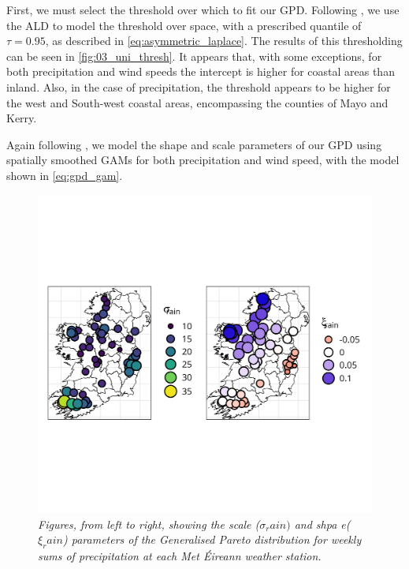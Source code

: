 \documentclass{article}
\numberwithin{equation}{section}
\begin{document}
First, we must select the threshold over which to fit our GPD. 
Following \citet{Youngman2019}, we use the ALD to model the threshold over space, with a prescribed quantile of $\tau = 0.95$, as described in \ref{eq:asymmetric_laplace}.
The results of this thresholding can be seen in \ref{fig:03_uni_thresh}.
It appears that, with some exceptions, for both precipitation and wind speeds the intercept is higher for coastal areas than inland.
Also, in the case of precipitation, the threshold appears to be higher for the west and South-west coastal areas, encompassing the counties of Mayo and Kerry.


Again following \citet{Youngman2019}, we model the shape and scale parameters of our GPD using spatially smoothed GAMs for both precipitation and wind speed, with the model shown in \ref{eq:gpd_gam}.

\begin{figure}[H]
    \centering
    \includegraphics[width = 0.9\linewidth]{plots/032_gpd_rain.png}
    \caption{\emph{Figures, from left to right, showing the scale ($\sigma_rain)$ and shpa e($\xi_rain$) parameters of the Generalised Pareto distribution for weekly sums of precipitation at each Met Éireann weather station.}}
    \label{fig:03_gpd_rain}
\end{figure}
\end{document}
